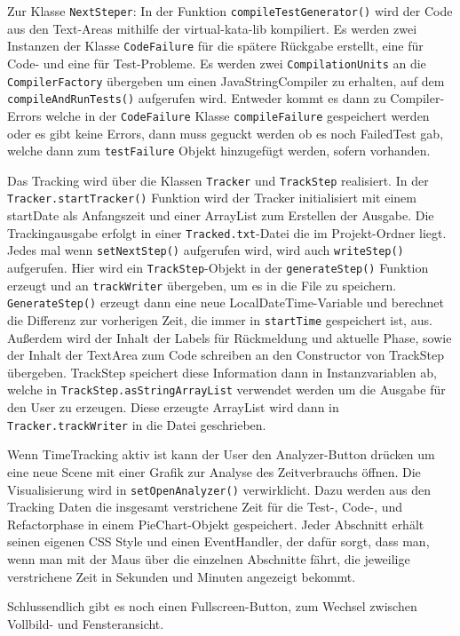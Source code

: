 \documentclass[10pt]{article}
\begin{document}
Zur Klasse \verb+NextSteper+:
In der Funktion \verb+compileTestGenerator()+ wird der Code aus den Text-Areas mithilfe der virtual-kata-lib kompiliert. Es werden zwei Instanzen der Klasse \verb+CodeFailure+ für die spätere Rückgabe erstellt, eine für Code- und eine für Test-Probleme. Es werden zwei \verb+CompilationUnits+ an die \verb+CompilerFactory+ übergeben um einen JavaStringCompiler zu erhalten, auf dem \verb+compileAndRunTests()+ aufgerufen wird.
Entweder kommt es dann zu Compiler-Errors welche in der \verb+CodeFailure+ Klasse \verb+compileFailure+ gespeichert werden oder es gibt keine Errors, dann muss geguckt werden ob es noch FailedTest gab, welche dann zum \verb+testFailure+ Objekt hinzugefügt werden, sofern vorhanden.

Das Tracking wird über die Klassen \verb+Tracker+ und \verb+TrackStep+ realisiert.
In der \verb+Tracker.startTracker()+ Funktion wird der Tracker initialisiert mit einem startDate als Anfangszeit und einer ArrayList zum Erstellen der Ausgabe. Die Trackingausgabe erfolgt in einer \verb+Tracked.txt+-Datei die im Projekt-Ordner liegt. Jedes mal wenn \verb+setNextStep()+ aufgerufen wird, wird auch \verb+writeStep()+ aufgerufen. Hier wird ein \verb+TrackStep+-Objekt in der \verb+generateStep()+ Funktion erzeugt und an \verb+trackWriter+ übergeben, um es in die File zu speichern. \verb+GenerateStep()+ erzeugt dann eine neue LocalDateTime-Variable und berechnet die Differenz zur vorherigen Zeit, die immer in \verb+startTime+ gespeichert ist, aus. Außerdem wird der Inhalt der Labels für Rückmeldung und aktuelle Phase, sowie der Inhalt der TextArea zum Code schreiben an den Constructor von TrackStep übergeben.
TrackStep speichert diese Information dann in Instanzvariablen ab, welche in \verb+TrackStep.asStringArrayList+ verwendet werden um die Ausgabe für den User zu erzeugen. Diese erzeugte ArrayList wird dann in \verb+Tracker.trackWriter+ in die Datei geschrieben.

Wenn TimeTracking aktiv ist kann der User den Analyzer-Button drücken um eine neue Scene mit einer Grafik zur Analyse des Zeitverbrauchs öffnen. Die Visualisierung wird in \verb+setOpenAnalyzer()+ verwirklicht. Dazu werden aus den Tracking Daten die insgesamt verstrichene Zeit für die Test-, Code-, und Refactorphase in einem PieChart-Objekt gespeichert. Jeder Abschnitt erhält seinen eigenen CSS Style und einen EventHandler, der dafür sorgt, dass man, wenn man mit der Maus über die einzelnen Abschnitte fährt, die jeweilige verstrichene Zeit in Sekunden und Minuten angezeigt bekommt.

Schlussendlich gibt es noch einen Fullscreen-Button, zum Wechsel zwischen Vollbild- und Fensteransicht.
\end{document}
